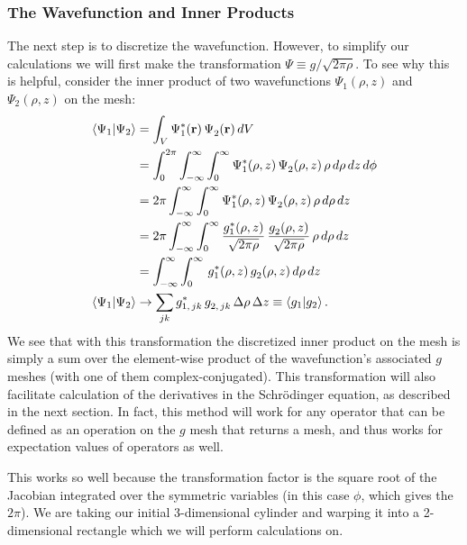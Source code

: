 \documentclass[12pt]{article}
\newcommand{\R}{\mathbf{r}}
\numberwithin{equation}{section}
\begin{document}
\subsubsection{The Wavefunction and Inner Products}
The next step is to discretize the wavefunction. However, to simplify our calculations we will first make the transformation $\Psi \equiv g/\sqrt{2 \pi \rho}$. To see why this is helpful, consider the inner product of two wavefunctions $\Psi_1(\rho, z)$ and $\Psi_2(\rho, z)$ on the mesh:
\begin{align*}
\braket{\Psi_1}{\Psi_2} &= \int_V \Psi^*_1(\R) \, \Psi^{}_2(\R) \, dV \\
&= \int_{0}^{2\pi} \int_{-\infty}^{\infty} \int_{0}^{\infty} \Psi^*_1(\rho, z) \, \Psi^{}_2(\rho, z) \, \rho \, d\rho \, dz \, d\phi \\
&= 2 \pi \int_{-\infty}^{\infty} \int_{0}^{\infty} \Psi^*_1(\rho, z) \, \Psi^{}_2(\rho, z) \, \rho \,  d\rho \, dz \\
&= 2 \pi \int_{-\infty}^{\infty} \int_{0}^{\infty} \frac{g^*_1(\rho, z)}{\sqrt{2 \pi \rho}} \, \frac{g^{}_2(\rho, z)}{\sqrt{2 \pi \rho}} \, \rho \, d\rho \, dz \\
&= \int_{-\infty}^{\infty} \int_{0}^{\infty} \, g^*_1(\rho, z) \, g^{}_2(\rho, z) \, d\rho \, dz \\
\braket{\Psi_1}{\Psi_2} &\rightarrow \sum_{jk} g^*_{1, \, jk} \, g^{}_{2, \, jk} \, \Delta \rho \, \Delta z \equiv \braket{g_1}{g_2}.
\end{align*}
We see that with this transformation the discretized inner product on the mesh is simply a sum over the element-wise product of the wavefunction's associated $g$ meshes (with one of them complex-conjugated). This transformation will also facilitate calculation of the derivatives in the Schr\"{o}dinger equation, as described in the next section. In fact, this method will work for any operator that can be defined as an operation on the $g$ mesh that returns a mesh, and thus works for expectation values of operators as well.

This works so well because the transformation factor is the square root of the Jacobian integrated over the symmetric variables (in this case $\phi$, which gives the $2\pi$). We are taking our initial 3-dimensional cylinder and warping it into a 2-dimensional rectangle which we will perform calculations on.

\end{document}
